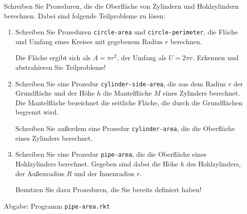 Schreiben Sie Prozeduren, die die Oberfl\"ache von Zylindern und
Hohlzylindern berechnen. Dabei sind folgende Teilprobleme zu l\"osen:

 \begin{enumerate}
   \item Schreiben Sie Prozeduren
     \texttt{circle-area} und \texttt{circle-perimeter}, die Fl\"ache
     und Umfang eines Kreises mit gegebenem Radius $r$ berechnen.

     Die Fl\"ache ergibt sich als $A=\pi r^2$, der Umfang als $U =
     2\pi r$. Erkennen und abstrahieren Sie Teilprobleme!

   \item Schreiben Sie eine Prozedur
     \texttt{cylinder-side-area}, die aus dem Radius $r$ der
     Grundfl\"ache und der H\"ohe $h$ die Mantelfl\"ache $M$ eines
     Zylinders berechnet. Die Mantelfl\"ache bezeichnet die seitliche 
     Fl\"ache, die durch die Grundfl\"achen begrenzt wird.

     Schreiben Sie au\ss erdem eine Prozedur \texttt{cylinder-area},
     die die Oberfl\"ache eines Zylinders berechnet.

   \item Schreiben Sie eine Prozedur
     \texttt{pipe-area}, die die Oberfl\"ache eines Hohlzylinders 
     berechnet. Gegeben sind dabei die H\"ohe $h$ des Hohlzylinders, 
     der Au\ss enradius $R$ und der Innenradius $r$.

     Benutzen Sie dazu Prozeduren, die Sie bereits definiert haben!
 \end{enumerate}


  Abgabe:    Programm \texttt{pipe-area.rkt}
  

    \begin{solution}
\pagebreak
     
  \end{solution}

